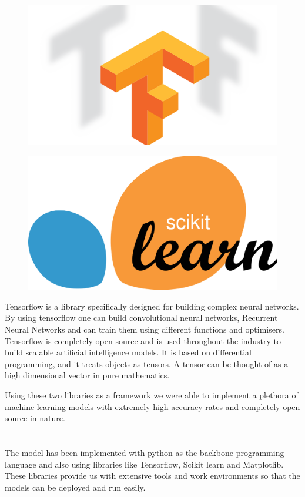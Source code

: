 \documentclass[12pt]{article}
\newcommand{\nd}{\noindent}
\newcommand{\secsize}{\fontsize{15pt}{12pt}\selectfont}
\begin{document}
\begin{figure}[h]
\centering
\begin{minipage}{.5\textwidth}
  \centering
  \includegraphics[width=.65\linewidth]{tf.png}
  \label{fig:test1}
\end{minipage}%
\begin{minipage}{.5\textwidth}
  \centering
  \includegraphics[width=.65\linewidth]{sk.png}
  \label{fig:test2}
\end{minipage}
\end{figure}

\nd Tensorflow is a library specifically designed for building complex neural networks. By using tensorflow one can build convolutional neural networks, Recurrent Neural Networks and can train them using different functions and optimisers. Tensorflow is completely open source and is used throughout the industry to build scalable artificial intelligence models. It is based on differential programming, and it treats objects as tensors. A tensor can be thought of as a high dimensional vector in pure mathematics. 

\nd Using these two libraries as a framework we were able to implement a plethora of machine learning models with extremely high accuracy rates and completely open source in nature. 

\newpage 
\section{\textbf{\secsize{IMPLEMENTATION}}}
The model has been implemented with python as the backbone programming language and also using libraries like Tensorflow, Scikit learn and Matplotlib. These libraries provide us with extensive tools and work environments so that the models can be deployed and run easily. 
\end{document}

